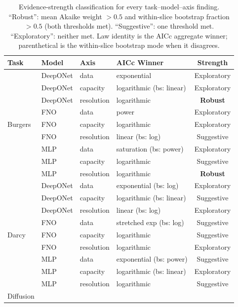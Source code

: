 \documentclass[11pt]{article}
\begin{document}
\begin{table}[h]
\centering
\caption{Evidence-strength classification for every task--model--axis
finding. ``Robust'': mean Akaike weight $>0.5$ and within-slice
bootstrap fraction $>0.5$ (both thresholds met). ``Suggestive'':
one threshold met. ``Exploratory'': neither met. Law identity is
the AICc aggregate winner; parenthetical is the within-slice
bootstrap mode when it disagrees.}
\label{tab:evidence-strength}
\small
\begin{tabular}{@{}llllc@{}}
\toprule
\textbf{Task} & \textbf{Model} & \textbf{Axis} &
\textbf{AICc Winner} & \textbf{Strength} \\
\midrule
\multirow{9}{*}{Burgers}
  & DeepONet & data       & exponential & Exploratory \\
  & DeepONet & capacity   & logarithmic (bs: linear) & Exploratory \\
  & DeepONet & resolution & logarithmic & \textbf{Robust} \\
  & FNO      & data       & power       & Exploratory \\
  & FNO      & capacity   & logarithmic & Exploratory \\
  & FNO      & resolution & linear (bs: log) & Suggestive \\
  & MLP      & data       & saturation (bs: power) & Exploratory \\
  & MLP      & capacity   & logarithmic & Suggestive \\
  & MLP      & resolution & logarithmic & \textbf{Robust} \\
\midrule
\multirow{9}{*}{Darcy}
  & DeepONet & data       & exponential (bs: log) & Exploratory \\
  & DeepONet & capacity   & logarithmic (bs: linear) & Suggestive \\
  & DeepONet & resolution & linear (bs: log) & Exploratory \\
  & FNO      & data       & stretched exp (bs: log) & Suggestive \\
  & FNO      & capacity   & logarithmic & Suggestive \\
  & FNO      & resolution & logarithmic & Exploratory \\
  & MLP      & data       & exponential (bs: power) & Suggestive \\
  & MLP      & capacity   & logarithmic (bs: linear) & Exploratory \\
  & MLP      & resolution & logarithmic & Suggestive \\
\midrule
\multirow{9}{*}{Diffusion}

\end{tabular}
\end{table}
\end{document}
